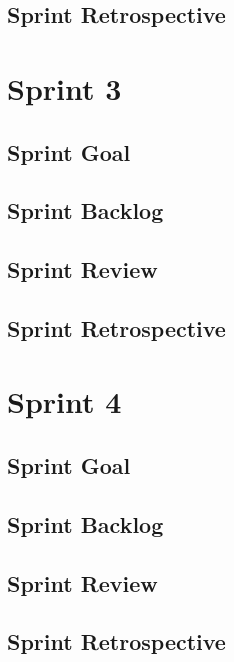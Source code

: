 \documentclass{report}
\begin{document}
    \section{Sprint Retrospective}
        
    
    \chapter{Sprint 3}
    \section{Sprint Goal}
        
    \section{Sprint Backlog}
        
    \section{Sprint Review}
        
    \section{Sprint Retrospective}
        
        
    \chapter{Sprint 4}
    \section{Sprint Goal}
        
    \section{Sprint Backlog}
        
    \section{Sprint Review}
        
    \section{Sprint Retrospective}
        
        
\end{document}
